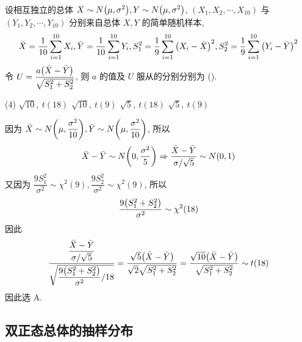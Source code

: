\begin{example}
    设相互独立的总体 $X\sim N\qty(\mu,\sigma^2),Y\sim N\qty(\mu,\sigma^2)$, $(X_1, X_2, \cdots ,X_{10})$ 与 $(Y_1, Y_2, \cdots ,Y_{10})$ 分别来自总体 $X,Y$ 的简单随机样本,
    $$
    \bar{X}=\dfrac{1}{10}\sum_{i=1}^{10} X_i, \bar{Y}=\dfrac{1}{10}\sum_{i=1}^{10} Y_i, S_1^2=\dfrac{1}{9}\sum_{i=1}^{10} \qty(X_i-\bar{X})^2,S_2^2=\dfrac{1}{9}\sum_{i=1}^{10} \qty(Y_i-\bar{Y})^2
    $$
    令 $U=\dfrac{a\qty(\bar{X}-\bar{Y})}{\sqrt{S_1^2+S_2^2}}$, 则 $a$ 的值及 $U$ 服从的分别分别为 (\quad).
    \begin{tasks}(4)
        \task $\sqrt{10},~t(18)$
        \task $\sqrt{10},~t(9)$
        \task $\sqrt{5},~t(18)$
        \task $\sqrt{5},~t(9)$
    \end{tasks}
\end{example}
\begin{solution}
    因为 $\bar{X}\sim N\qty(\mu,\dfrac{\sigma^2}{10}),\bar{Y}\sim N\qty(\mu,\dfrac{\sigma^2}{10})$, 所以 $$
    \bar{X}-\bar{Y}\sim N\qty(0,\dfrac{\sigma^2}{5})\Rightarrow \dfrac{\bar{X}-\bar{Y}}{\sigma /\sqrt{5}}\sim N(0,1)
    $$
    又因为 $\dfrac{9S_1^2}{\sigma^2}\sim \chi^2(9),\dfrac{9S_2^2}{\sigma^2}\sim \chi^2(9)$, 所以 $$
    \dfrac{9\qty(S_1^2+S_2^2)}{\sigma^2}\sim \chi^2(18)
    $$
    因此 $$
    \dfrac{\dfrac{\bar{X}-\bar{Y}}{\sigma /\sqrt{ 5}}}{\sqrt{\dfrac{9\qty(S_1^2+S_2^2)}{\sigma^2}/18} }=\dfrac{\sqrt{5}\qty(\bar{X}-\bar{Y})}{\sqrt{2}\sqrt{S_1^2+S_2^2}}=\dfrac{\sqrt{10}\qty(\bar{X}-\bar{Y})}{\sqrt{S_1^2+S_2^2}}\sim t(18)
    $$
    因此选 A.
\end{solution}

\subsection{双正态总体的抽样分布}

